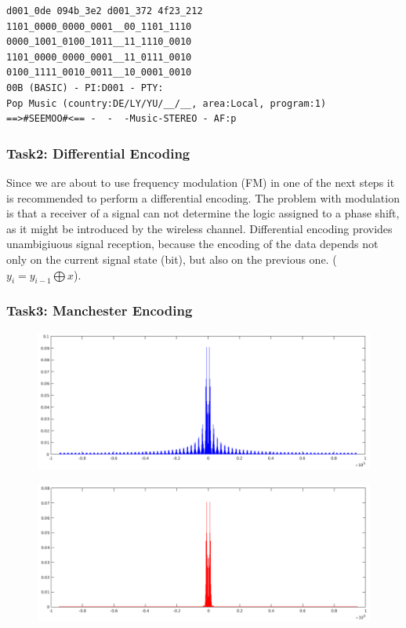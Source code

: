\documentclass[sigconf]{acmart}
\begin{document}
\begin{verbatim}
d001_0de 094b_3e2 d001_372 4f23_212
1101_0000_0000_0001__00_1101_1110
0000_1001_0100_1011__11_1110_0010
1101_0000_0000_0001__11_0111_0010
0100_1111_0010_0011__10_0001_0010
00B (BASIC) - PI:D001 - PTY:
Pop Music (country:DE/LY/YU/__/__, area:Local, program:1)
==>#SEEMOO#<== -  -  -Music-STEREO - AF:p
\end{verbatim}

\hypertarget{Task2:ux20Differentialux20Encoding}{%
\subsubsection{Task2: Differential
Encoding}\label{Task2:ux20Differentialux20Encoding}}

Since we are about to use frequency modulation (FM) in one of the next
steps it is recommended to perform a differential encoding. The problem
with modulation is that a receiver of a signal can not determine the
logic assigned to a phase shift, as it might be introduced by the
wireless channel. Differential encoding provides unambigiuous signal
reception, because the encoding of the data depends not only on the
current signal state (bit), but also on the previous one.
(\(y_i = y_{i-1} \bigoplus x\)).


\hypertarget{Task3:ux20Manchesterux20Encoding}{%
\subsubsection{Task3: Manchester
Encoding}\label{Task3:ux20Manchesterux20Encoding}}

\begin{figure}[tb!]
	\hfill
	\includegraphics[width=1\linewidth]{rds_plot.png}
	\caption{}
	\label{fig:rds_plot}
\end{figure}

\begin{figure}[tb!]
	\includegraphics[width=1\linewidth]{rds_filt_plot.png}
	\caption{}
	\label{fig:rds_filt_plot}
\end{figure}
\end{document}
